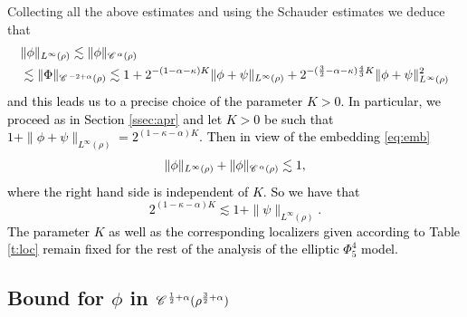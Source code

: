 \documentclass[a4paper,11pt]{article}
\numberwithin{equation}{section}
\newcommand{\CC}{\mathscr{C} \hspace{.1em}}
\newcommand{\rmbb}[1]{\textcolor{black}{#1}}
\newcommand{\8}{\infty}
\begin{document}
Collecting all the above estimates and using the Schauder estimates we  deduce that 
\begin{align*}
&\|\phi\|_{L^\infty(\rho)}\lesssim  \|\phi\|_{\CC^\alpha(\rho)} \\
&\lesssim\|\Phi\|_{\CC^{-2+\alpha}(\rho)}\lesssim 1+2^{-(1-\alpha-\kappa)K}\|\phi+\psi\|_{L^\infty(\rho)}+2^{-(\frac{3}{2}-\alpha-\kappa)\frac{4}{3}K}\|\phi+\psi\|^2_{L^\infty(\rho)}
\end{align*}
\rmbb{\rmbb{and this leads us to a precise choice of the parameter $K>0$. In particular, we proceed as in Section \ref{ssec:apr} and let $K>0$ be such that $1+\|\phi+\psi\|_{L^\infty(\rho)}= 2^{(1-\kappa-\alpha)K}$. Then  in view of the embedding \eqref{eq:emb}}
\begin{equation}\label{eq:10}
\|\phi\|_{L^\infty(\rho)}+ \|\phi\|_{\CC^\alpha(\rho)}\lesssim 1,
\end{equation}
  \rmbb{where the right hand side is independent of $ K$.} So we have that
  \begin{equation}\label{eq:5.15}
  2^{(1-\kappa-\alpha)K}\lesssim 1+\|\psi\|_{L^\infty(\rho)}.
  \end{equation}
 \rmbb{The parameter $K$ as well as the corresponding localizers given according to Table \ref{t:loc} remain fixed for the rest of the analysis of the elliptic $\Phi^{4}_{5}$ model}. }



% 
 

\subsection{Bound for $\phi$ in $\CC^{\frac{1}{2}+\alpha}(\rho^{\frac{3}{2}+\alpha})$}
\label{ssec:phi2}
\end{document}
